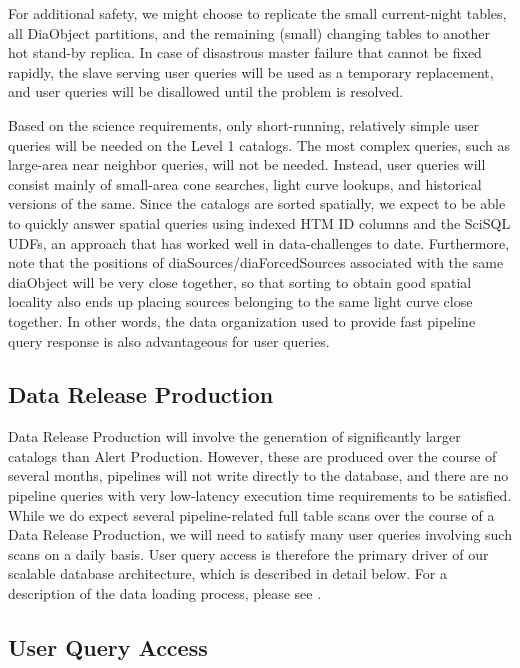\documentclass[DM,toc]{lsstdoc}
\begin{document}
For additional safety, we might choose to replicate the small
current-night tables, all DiaObject partitions, and the remaining
(small) changing tables to another hot stand-by replica. In case of
disastrous master failure that cannot be fixed rapidly, the slave
serving user queries will be used as a temporary replacement, and user
queries will be disallowed until the problem is resolved.

Based on the science requirements, only short-running, relatively simple
user queries will be needed on the Level 1 catalogs. The most complex
queries, such as large-area near neighbor queries, will not be needed.
Instead, user queries will consist mainly of small-area cone searches,
light curve lookups, and historical versions of the same. Since the
catalogs are sorted spatially, we expect to be able to quickly answer
spatial queries using indexed HTM ID columns and the SciSQL UDFs, an
approach that has worked well in data-challenges to date. Furthermore,
note that the positions of diaSources/diaForcedSources associated with
the same diaObject will be very close together, so that sorting to
obtain good spatial locality also ends up placing sources belonging to
the same light curve close together. In other words, the data
organization used to provide fast pipeline query response is also
advantageous for user queries.

\subsection{Data Release Production}\label{data-release-production}

Data Release Production will involve the generation of significantly
larger catalogs than Alert Production. However, these are produced over
the course of several months, pipelines will not write directly to the
database, and there are no pipeline queries with very low-latency
execution time requirements to be satisfied. While we do expect several
pipeline-related full table scans over the course of a Data Release
Production, we will need to satisfy many user queries involving such
scans on a daily basis. User query access is therefore the primary
driver of our scalable database architecture, which is described in
detail below. For a description of the data loading process, please see
.

\subsection{User Query Access}\label{user-query-access}
\end{document}
